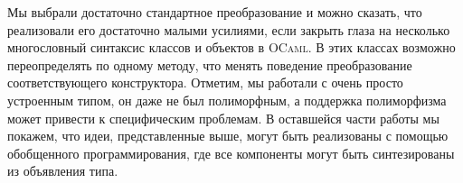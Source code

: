 \begin{comment}

\begin{lstlisting}
class simplify fself = object 
  inherit map fself
  method $\inbr{Binop}$ _ o l r =
    match fself () l, fself () r with
    | Const l, Const r -> 
        Const ((op o) l r)
    | l, r -> 
        Binop (o, l, r)
end
\end{lstlisting}

\noindent Данный класс производит упрощение выражения: если оба аргумента бинарной операции вычисляются в константу тем же самым преобразованием, тогда 
мы можем произвести операцию сразу. Функция ``\lstinline{op}'' объявлена где-то ещё, она возвращает функцию, которая будет производить вычисление данного бинарного оператора.

Вот ещё один пример:

\begin{lstlisting}
class substitute fself state = object 
  inherit map fself
  method $\inbr{Var}$ _ x = Const (state x)  
end
\end{lstlisting}

\noindent Здесь мы выполняем подстановку переменных в выражении на значения, определенные в некотором состоянии, представленном функций ``\lstinline{state}''. Два класса, объявленных выше могут быть скомбинированы для получения интерпретатора выражений:

\begin{lstlisting}
class eval fself state =  object
  inherit substitute fself state
  inherit simplify   fself
end

let eval state e =
  fix (fun fself ->
    gcata (new eval fself state)) () e  
\end{lstlisting}
\end{comment}

Мы выбрали достаточно стандартное преобразование и можно сказать, что реализовали его достаточно малыми усилиями,
если закрыть глаза на несколько многословный синтаксис классов и объектов в  \textsc{OCaml}. В этих классах возможно переопределять по одному методу, что менять поведение преобразование соответствующего конструктора.
Отметим, мы работали с очень просто устроенным типом, он даже не был полиморфным, а поддержка полиморфизма может привести к 
специфическим проблемам. В оставшейся части работы мы покажем, что идеи, представленные выше, могут быть реализованы с помощью обобщенного программирования, где все компоненты могут быть синтезированы из объявления типа. 


